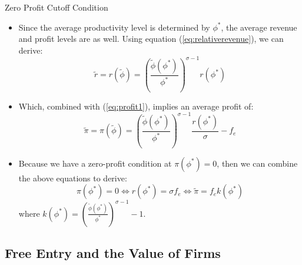 \documentclass[aspectratio=169]{beamer}
\begin{document}
\begin{frame}{Zero Profit Cutoff Condition}

\begin{itemize}
    \item<1-> Since the average productivity level is determined by $ \phi^{*} $, the average revenue and profit levels are as well.  Using equation (\ref{eq:relativerevenue}), we can derive:
    \begin{equation*}
        \tilde{r} = r\left( \tilde{\phi} \right) = \left( \frac{\tilde{\phi}\left( \phi^{*} \right)}{\phi^{*}} \right)^{\sigma - 1} r\left( \phi^{*} \right)
    \end{equation*}
    \item<2-> Which, combined with (\ref{eq:profit1}), implies an average profit of:
    \begin{equation*}
        \tilde{\pi} = \pi\left( \tilde{\phi} \right) = \left( \frac{\tilde{\phi}\left( \phi^{*} \right)}{\phi^{*}} \right)^{\sigma - 1} \frac{r\left( \phi^{*} \right)}{\sigma} - f_{e}
    \end{equation*}
    \item<3-> Because we have a zero-profit condition at $ \pi\left( \phi^{*} \right) = 0 $, then we can combine the above equations to derive:
    \begin{equation}
        \pi\left( \phi^{*} \right) = 0 \Leftrightarrow r\left( \phi^{*} \right) = \sigma f_{e} \Leftrightarrow \tilde{\pi} = f_{e} k\left( \phi^{*} \right)
        \label{eq:zerocutoffcondition}
    \end{equation}
    where $ k\left( \phi^{*} \right) = \left( \frac{\tilde{\phi}\left( \phi^{*} \right)}{\phi^{*}} \right)^{\sigma - 1} - 1 $.
\end{itemize}
    
\end{frame}


\subsection{Free Entry and the Value of Firms}

\end{document}
